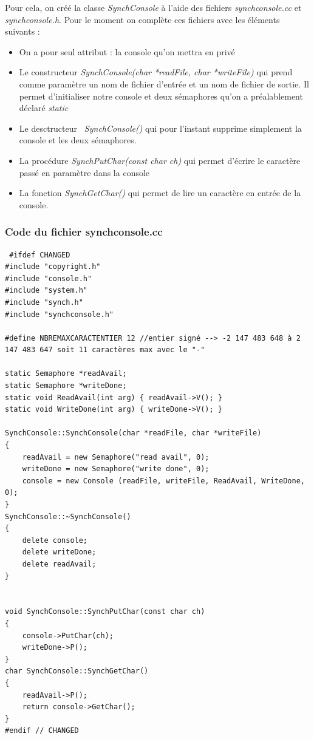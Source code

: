 \documentclass[a4paper,10pt]{article}
\begin{document}
  Pour cela, on créé la classe \emph{SynchConsole} à l'aide des fichiers \emph{synchconsole.cc} et \emph{synchconsole.h}. Pour le moment on complète ces fichiers
  avec les éléments suivants : 
  \begin{itemize}
   \item On a pour seul attribut : la console qu'on mettra en privé
   \item Le constructeur \emph{SynchConsole(char *readFile, char *writeFile)} qui prend comme paramètre un nom de fichier d'entrée et un nom de fichier de sortie.
   Il permet d'initialiser notre console et deux sémaphores qu'on a préalablement déclaré \emph{static}
   \item Le desctructeur \emph{~SynchConsole()} qui pour l'instant supprime simplement la console et les deux sémaphores.
   \item La procédure \emph{SynchPutChar(const char ch)} qui permet d'écrire le caractère passé en paramètre dans la console
   \item La fonction \emph{SynchGetChar()} qui permet de lire un caractère en entrée de la console.
  \end{itemize}
\textcolor{TealBlue}{\subsubsection*{Code du fichier synchconsole.cc}}
\begin{lstlisting}
 #ifdef CHANGED
#include "copyright.h"
#include "console.h"
#include "system.h"
#include "synch.h"
#include "synchconsole.h"

#define NBREMAXCARACTENTIER 12 //entier signé --> -2 147 483 648 à 2 147 483 647 soit 11 caractères max avec le "-"

static Semaphore *readAvail;
static Semaphore *writeDone;
static void ReadAvail(int arg) { readAvail->V(); }
static void WriteDone(int arg) { writeDone->V(); }

SynchConsole::SynchConsole(char *readFile, char *writeFile)
{
	readAvail = new Semaphore("read avail", 0);
	writeDone = new Semaphore("write done", 0);
	console = new Console (readFile, writeFile, ReadAvail, WriteDone, 0);
}
SynchConsole::~SynchConsole()
{
	delete console;
	delete writeDone;
	delete readAvail;
}


void SynchConsole::SynchPutChar(const char ch)
{
	console->PutChar(ch);
	writeDone->P();
}
char SynchConsole::SynchGetChar()
{
	readAvail->P();
	return console->GetChar();
}
#endif // CHANGED
\end{lstlisting}
\end{document}
